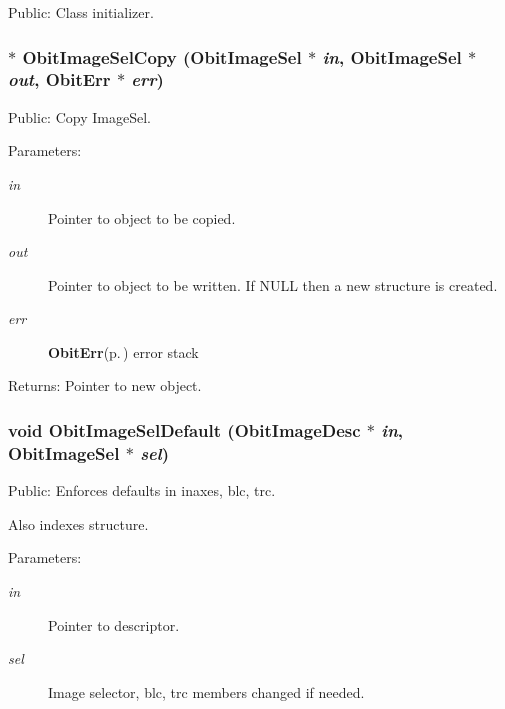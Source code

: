 Public: Class initializer. 

\subsubsection{$\ast$ Obit\-Image\-Sel\-Copy ({\bf Obit\-Image\-Sel} $\ast$ {\em in}, {\bf Obit\-Image\-Sel} $\ast$ {\em out}, {\bf Obit\-Err} $\ast$ {\em err})}\label{ObitImageSel_8h_a7}


Public: Copy Image\-Sel. 

\begin{Desc}
\item[Parameters:]
\begin{description}
\item[{\em in}]Pointer to object to be copied. \item[{\em out}]Pointer to object to be written. If NULL then a new structure is created. \item[{\em err}]{\bf Obit\-Err}{\rm (p.\,\pageref{structObitErr})} error stack \end{description}
\end{Desc}
\begin{Desc}
\item[Returns:]Pointer to new object. \end{Desc}
\subsubsection{\setlength{\rightskip}{0pt plus 5cm}void Obit\-Image\-Sel\-Default ({\bf Obit\-Image\-Desc} $\ast$ {\em in}, {\bf Obit\-Image\-Sel} $\ast$ {\em sel})}\label{ObitImageSel_8h_a9}


Public: Enforces defaults in inaxes, blc, trc. 

Also indexes structure. \begin{Desc}
\item[Parameters:]
\begin{description}
\item[{\em in}]Pointer to descriptor. \item[{\em sel}]Image selector, blc, trc members changed if needed. \end{description}
\end{Desc}
